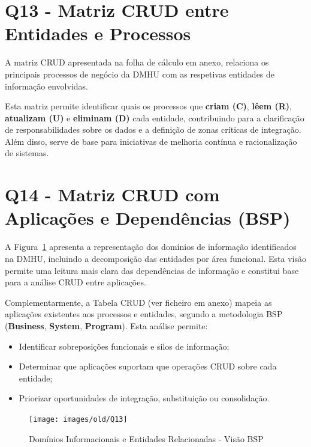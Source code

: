\documentclass[12pt,a4paper,final]{article}
\begin{document}
    \section*{Q13 - Matriz CRUD entre Entidades e Processos}

    A matriz CRUD apresentada na folha de cálculo em anexo, relaciona os principais processos de negócio da DMHU com as respetivas entidades de informação envolvidas.

    Esta matriz permite identificar quais os processos que \textbf{criam (C)}, \textbf{lêem (R)}, \textbf{atualizam (U)} e \textbf{eliminam (D)} cada entidade, contribuindo para a clarificação de responsabilidades sobre os dados e a definição de zonas críticas de integração.
    Além disso, serve de base para iniciativas de melhoria contínua e racionalização de sistemas.

    \section*{Q14 - Matriz CRUD com Aplicações e Dependências (BSP)}

    A Figura~\ref{fig:q14-domains} apresenta a representação dos domínios de informação identificados na DMHU, incluindo a decomposição das entidades por área funcional.
    Esta visão permite uma leitura mais clara das dependências de informação e constitui base para a análise CRUD entre aplicações.

    Complementarmente, a Tabela CRUD (ver ficheiro em anexo) mapeia as aplicações existentes aos processos e entidades, segundo a metodologia BSP (\textbf{Business}, \textbf{System}, \textbf{Program}). Esta análise permite:
    \begin{itemize}
        \item Identificar sobreposições funcionais e silos de informação;
        \item Determinar que aplicações suportam que operações CRUD sobre cada entidade;
        \item Priorizar oportunidades de integração, substituição ou consolidação.
    \end{itemize}

    \vspace{0.5cm}
    \begin{figure}[H]
        \centering
        \texttt{[image: images/old/Q13]}
        \caption{Domínios Informacionais e Entidades Relacionadas - Visão BSP}
        \label{fig:q14-domains}
    \end{figure}


    \newpage
    \nocite{*}
    \printbibliography
\end{document}
